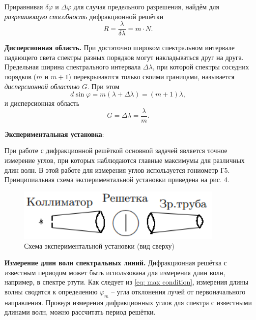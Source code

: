 \documentclass[a4paper,12pt]{article}
\begin{document}
Приравнивая $\delta\varphi$ и $\Delta\varphi$ для случая предельного разрешения, найдём для \textit{разрешающую способность} дифракционной решётки
\begin{equation}
    R = \frac{\lambda}{\delta\lambda} = m \cdot N.
\end{equation}


\textbf{Дисперсионная область.} При достаточно широком спектральном интервале падающего света спектры разных порядков могут накладываться друг на друга. Предельная ширина спектрального интервала $\Delta\lambda$, при которой спектры соседних порядков ($m$ и $m + 1$) перекрываются только своими границами, называется \textit{дисперсионной областью} $G$. При этом 
\[d\sin\varphi = m(\lambda + \Delta\lambda ) = (m + 1)\lambda,\]
и дисперсионная область
\begin{equation}\label{eq: dispersion region}
    G = \Delta\lambda = \frac{\lambda}{m}.
\end{equation}

\textbf{Экспериментальная установка}:

При работе с дифракционной решёткой основной задачей является точное измерение углов, при которых наблюдаются главные максимумы для различных длин волн. В этой работе для измерения углов используется гониометр Г5. Принципиальная схема экспериментальной установки приведена на рис. 4.

\begin{figure}\label{fig: Experimental setup}
    \begin{center}
    \vspace{-20pt}
        \includegraphics[width = 0.9\textwidth]{Experimental setup.png}
    \end{center}
    \caption{Схема экспериментальной установки (вид сверху)}
\end{figure}    
\textbf{Измерение длин волн спектральных линий.} Дифракционная решётка
с известным периодом может быть использована для измерения длин волн, например, в спектре ртути. Как следует из \eqref{eq: max condition}, измерения длины волны сводятся к определению $\varphi_m$ -- угла отклонения лучей от первоначального направления. Проведя измерения дифракционных углов для спектра с известными длинами волн, можно рассчитать период решётки.
\end{document}
